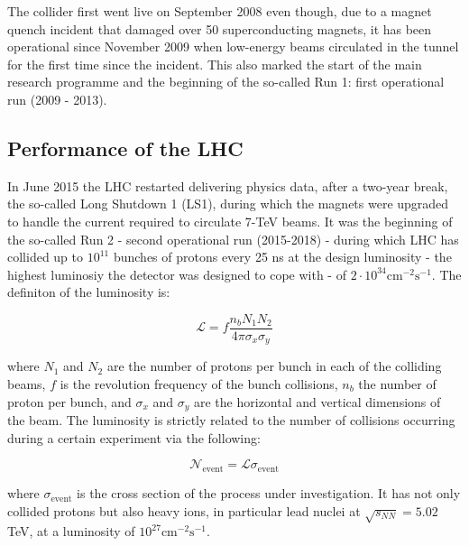 		The collider first went live on September 2008 even though, due to a magnet quench incident that damaged over 50 superconducting magnets, it has been operational since November 2009 when low-energy beams circulated in the tunnel for the first time since the incident. This also marked the start of the main research programme and the beginning of the so-called Run 1: first operational run (2009 - 2013).


		\subsection*{Performance of the LHC}

			In June 2015 the LHC restarted delivering physics data, after a two-year break, the so-called Long Shutdown 1 (LS1), during which the magnets were upgraded to handle the current required to circulate 7-TeV beams. It was the beginning of the so-called Run 2 - second operational run (2015-2018) - during which LHC has collided up to $10^{11}$ bunches of protons every 25 ns at the design luminosity - the highest luminosiy the detector was designed to cope with - of $2 \cdot 10^{34} \mathrm{cm}^{-2}\mathrm{s}^{-1}$. The definiton of the luminosity is:

			\begin{equation}
				{\mathcal L} = f \frac{n_b N_1 N_2}{4 \pi \sigma_x \sigma_y}
			\label{eq:lumi}
			\end{equation}

			\noindent where $N_1$ and $N_2$ are the number of protons per bunch in each of the colliding beams, $f$ is the revolution frequency of the bunch collisions, $n_b$ the number of proton per bunch, and $\sigma_x$ and $\sigma_y$ are the horizontal and vertical dimensions of the beam. The luminosity is strictly related to the number of collisions occurring during a certain experiment via the following: 

			\begin{equation}
					{\mathcal N}_{\mathrm{event}} = {\mathcal L} \sigma_{\mathrm{event}}
			\label{eq:lumiEvt}
			\end{equation}

			\noindent where $\sigma_{\mathrm{event}}$ is the cross section of the process under investigation.  It has not only collided protons but also heavy ions, in particular lead nuclei at $\sqrt{s_{NN}} = 5.02$ TeV, at a luminosity of $10^{27} \mathrm{cm}^{-2} \mathrm{s}^{-1}$\cite{HI2015}.



